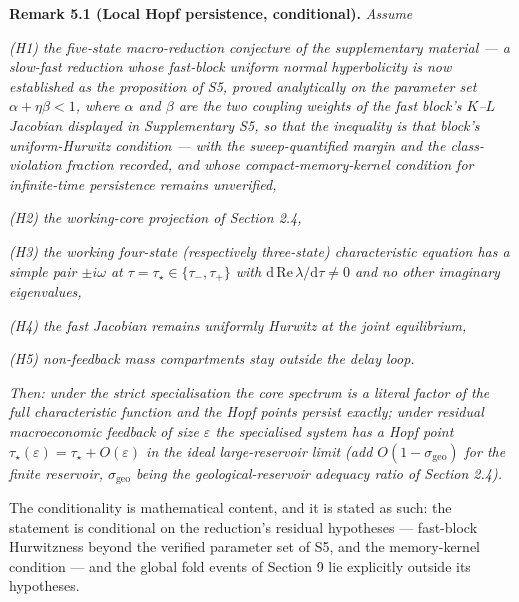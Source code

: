 \documentclass[11pt]{article}
\begin{document}
\textbf{Remark 5.1 (Local Hopf persistence, conditional).} \emph{Assume}

\emph{(H1) the five-state macro-reduction conjecture of the
supplementary material --- a slow-fast reduction whose fast-block
uniform normal hyperbolicity is now established as the proposition of
S5, proved analytically on the parameter set \(\alpha + \eta\beta < 1\),
where \(\alpha\) and \(\beta\) are the two coupling weights of the fast
block's \(K\)--\(L\) Jacobian displayed in Supplementary S5, so that the
inequality is that block's uniform-Hurwitz condition --- with the
sweep-quantified margin and the class-violation fraction recorded, and
whose compact-memory-kernel condition for infinite-time persistence
remains unverified,}

\emph{(H2) the working-core projection of Section 2.4,}

\emph{(H3) the working four-state (respectively three-state)
characteristic equation has a simple pair \(\pm i\omega\) at
\(\tau = \tau_\star \in \{\tau_-, \tau_+\}\) with
\(\mathrm{d\,Re}\,\lambda/\mathrm{d}\tau \ne 0\) and no other imaginary
eigenvalues,}

\emph{(H4) the fast Jacobian remains uniformly Hurwitz at the joint
equilibrium,}

\emph{(H5) non-feedback mass compartments stay outside the delay loop.}

\emph{Then: under the strict specialisation the core spectrum is a
literal factor of the full characteristic function and the Hopf points
persist exactly; under residual macroeconomic feedback of size
\(\varepsilon\) the specialised system has a Hopf point
\(\tau_\star(\varepsilon) = \tau_\star + O(\varepsilon)\) in the ideal
large-reservoir limit (add \(O(1 - \sigma_{\mathrm{geo}})\) for the
finite reservoir, \(\sigma_{\mathrm{geo}}\) being the
geological-reservoir adequacy ratio of Section 2.4).}

The conditionality is mathematical content, and it is stated as such:
the statement is conditional on the reduction's residual hypotheses ---
fast-block Hurwitzness beyond the verified parameter set of S5, and the
memory-kernel condition --- and the global fold events of Section 9 lie
explicitly outside its hypotheses.
\end{document}
